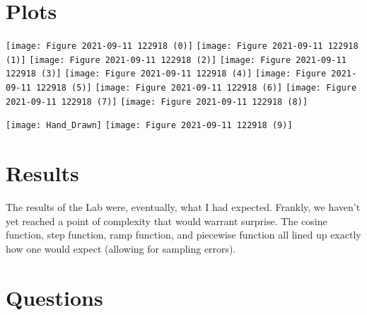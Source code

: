 \documentclass[12pt]{report}
\begin{document}
\section{Plots}
\begin{center}
    \texttt{[image: Figure 2021-09-11 122918 (0)]}
    \texttt{[image: Figure 2021-09-11 122918 (1)]}
    \texttt{[image: Figure 2021-09-11 122918 (2)]}
    \texttt{[image: Figure 2021-09-11 122918 (3)]}
    \texttt{[image: Figure 2021-09-11 122918 (4)]}
    \texttt{[image: Figure 2021-09-11 122918 (5)]}
    \texttt{[image: Figure 2021-09-11 122918 (6)]}
    \texttt{[image: Figure 2021-09-11 122918 (7)]}
    \texttt{[image: Figure 2021-09-11 122918 (8)]}
\end{center}
\begin{center}
    \texttt{[image: Hand\_Drawn]}
    \texttt{[image: Figure 2021-09-11 122918 (9)]}
\end{center}


\section{Results}

The results of the Lab were, eventually, what I had expected. Frankly, we haven't yet reached a point of complexity that would warrant surprise. The cosine function, step function, ramp function, and piecewise function all lined up exactly how one would expect (allowing for sampling errors).

\section{Questions}
\end{document}

